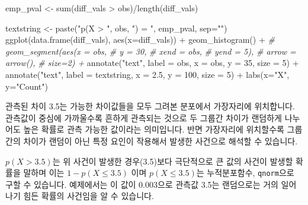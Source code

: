 \documentclass[
]{book}
\newenvironment{Shaded}{\begin{snugshade}}{\end{snugshade}}
\newcommand{\AttributeTok}[1]{\textcolor[rgb]{0.77,0.63,0.00}{#1}}
\newcommand{\CommentTok}[1]{\textcolor[rgb]{0.56,0.35,0.01}{\textit{#1}}}
\newcommand{\DecValTok}[1]{\textcolor[rgb]{0.00,0.00,0.81}{#1}}
\newcommand{\FloatTok}[1]{\textcolor[rgb]{0.00,0.00,0.81}{#1}}
\newcommand{\FunctionTok}[1]{\textcolor[rgb]{0.00,0.00,0.00}{#1}}
\newcommand{\NormalTok}[1]{#1}
\newcommand{\OtherTok}[1]{\textcolor[rgb]{0.56,0.35,0.01}{#1}}
\newcommand{\SpecialCharTok}[1]{\textcolor[rgb]{0.00,0.00,0.00}{#1}}
\newcommand{\StringTok}[1]{\textcolor[rgb]{0.31,0.60,0.02}{#1}}
\begin{document}
\begin{Shaded}
\begin{Highlighting}[]
\NormalTok{emp\_pval }\OtherTok{\textless{}{-}} \FunctionTok{sum}\NormalTok{(diff\_vals }\SpecialCharTok{\textgreater{}}\NormalTok{ obs)}\SpecialCharTok{/}\FunctionTok{length}\NormalTok{(diff\_vals)}

\NormalTok{textstring }\OtherTok{\textless{}{-}} \FunctionTok{paste}\NormalTok{(}\StringTok{"p(X \textgreater{} "}\NormalTok{, obs, }\StringTok{") = "}\NormalTok{, emp\_pval, }\AttributeTok{sep=}\StringTok{""}\NormalTok{)}
\FunctionTok{ggplot}\NormalTok{(}\FunctionTok{data.frame}\NormalTok{(diff\_vals), }\FunctionTok{aes}\NormalTok{(}\AttributeTok{x=}\NormalTok{diff\_vals)) }\SpecialCharTok{+} 
  \FunctionTok{geom\_histogram}\NormalTok{() }\SpecialCharTok{+}
  \CommentTok{\# geom\_segment(aes(x = obs, }
  \CommentTok{\#                  y = 30, }
  \CommentTok{\#                  xend = obs, }
  \CommentTok{\#                  yend = 5), }
  \CommentTok{\#              arrow = arrow(), }
  \CommentTok{\#              size=2) +}
  \FunctionTok{annotate}\NormalTok{(}\StringTok{"text"}\NormalTok{, }
           \AttributeTok{label =}\NormalTok{ obs, }
           \AttributeTok{x =}\NormalTok{ obs, }
           \AttributeTok{y =} \DecValTok{35}\NormalTok{, }
           \AttributeTok{size =} \DecValTok{5}\NormalTok{) }\SpecialCharTok{+}
  \FunctionTok{annotate}\NormalTok{(}\StringTok{"text"}\NormalTok{, }
           \AttributeTok{label =}\NormalTok{ textstring, }
           \AttributeTok{x =} \FloatTok{2.5}\NormalTok{, }
           \AttributeTok{y =} \DecValTok{100}\NormalTok{, }
           \AttributeTok{size =} \DecValTok{5}\NormalTok{) }\SpecialCharTok{+}
  \FunctionTok{labs}\NormalTok{(}\AttributeTok{x=}\StringTok{"X"}\NormalTok{, }\AttributeTok{y=}\StringTok{"Count"}\NormalTok{)}
\end{Highlighting}
\end{Shaded}

관측된 차이 3.5는 가능한 차이값들을 모두 그려본 분포에서 가장자리에 위치합니다. 관측값이 중심에 가까울수록 흔하게 관측되는 것으로 두 그룹간 차이가 랜덤하게 나누어도 높은 확률로 관측 가능한 값이라는 의미입니다. 반면 가장자리에 위치할수록 그룹간의 차이가 랜덤이 아닌 특정 요인이 작용해서 발생한 사건으로 해석할 수 있습니다.

\(p(X>3.5)\)는 위 사건이 발생한 경우(3.5)보다 극단적으로 큰 값의 사건이 발생할 확률을 말하며 이는 \(1-p(X \le 3.5)\) 이며 \(p(X \le 3.5)\)는 누적분포함수, \texttt{qnorm}으로 구할 수 있습니다. 예제에서는 이 값이 0.003으로 관측값 3.5는 랜덤으로는 거의 일어나기 힘든 확률의 사건임을 알 수 있습니다.
\end{document}
